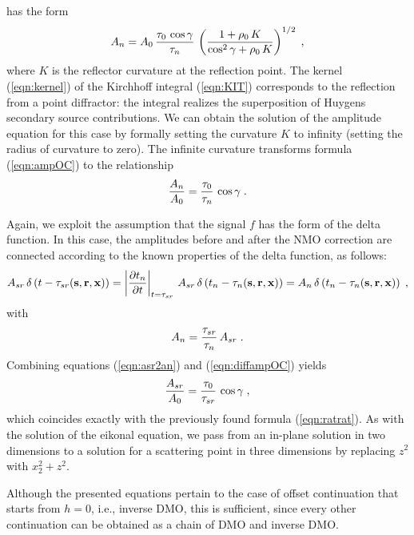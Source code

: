 has the form \cite[]{GEO68-02-07180732}
\begin{equation}
A_n = A_0\,{{\tau_0\,\cos{\gamma}}\over{\tau_n}}\,
\left({1+\rho_0\,K}\over{\cos^2{\gamma}+\rho_0\,K}\right)^{1/2}\;,
\label{eqn:ampOC} 
\end{equation}
where $K$ is the reflector curvature at the reflection point. The
kernel (\ref{eqn:kernel}) of the Kirchhoff integral (\ref{eqn:KIT})
corresponds to the reflection from a point diffractor: the integral
realizes the superposition of Huygens secondary source contributions.
We can obtain the solution of the amplitude equation for this case by
formally setting the curvature $K$ to infinity (setting the radius of
curvature to zero). The infinite curvature transforms formula
(\ref{eqn:ampOC}) to the relationship
\begin{equation}
{A_n \over A_0} = {\tau_0 \over \tau_n}\,\cos{\gamma}\;.
\label{eqn:diffampOC} 
\end{equation}
\par
Again, we exploit the assumption that
the signal $f$ has the form of the delta function.
In this case, the amplitudes
before and after the NMO correction are connected according to the
known properties of the delta function, as follows:
\begin{equation}
A_{sr}\,\delta\left(t - \tau_{sr}({\bf s,r,x})\right)=
\left|{{\partial t_n} \over {\partial t}}\right|_{t=\tau_{sr}}\,
A_{sr}\,\delta\left(t_n - \tau_n({\bf s,r,x})\right)=
A_n\,\delta\left(t_n - \tau_n({\bf s,r,x})\right)\;,
\label{eqn:NMOkernel}
\end{equation}
with 
\begin{equation}
A_n = {\tau_{sr} \over \tau_n}\,A_{sr}\;.
\label{eqn:asr2an} 
\end{equation}
Combining equations (\ref{eqn:asr2an}) and (\ref{eqn:diffampOC}) yields
\begin{equation}
{A_{sr} \over A_0} = {\tau_0 \over \tau_{sr}}\,\cos{\gamma}\;,
\label{eqn:final} 
\end{equation}
which coincides exactly with the previously found formula
(\ref{eqn:ratrat}).  As with the solution of the eikonal equation, we pass
from an in-plane solution in two dimensions to a solution for a
scattering point in three dimensions by replacing $z^2$ with $x_2^2 +
z^2$.
\par
Although the presented equations pertain to the case of offset
continuation that starts from $h=0$, i.e., inverse DMO, this is
sufficient, since every other continuation can be obtained as a chain
of DMO and inverse DMO.
